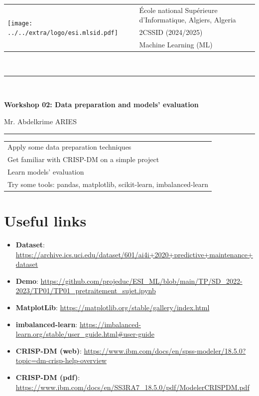 \documentclass[11pt, a4paper]{article}
\begin{document}
	
	\begin{tabular}{ll}
		\multirow{3}{*}{\texttt{[image: ../../extra/logo/esi.mlsid.pdf]}} & \'Ecole national Supérieure d'Informatique, Algiers, Algeria\\
		& 2CSSID (2024/2025)\\
		& Machine Learning (ML)
	\end{tabular}\\[.25cm]
	\noindent\rule{\textwidth}{1pt}\\[-0.5cm]
	\begin{center}
		{\LARGE \textbf{Workshop 02: Data preparation and models' evaluation}}
		\begin{flushright}
			Mr. Abdelkrime ARIES
		\end{flushright}
	\end{center}\vspace{-.25cm}
	\noindent\rule{\textwidth}{1pt}
	
	
	\begin{center}
		\begin{tabular}{|p{}|}
		\hline
		Apply some data preparation techniques \\
		Get familiar with CRISP-DM on a simple project\\
		Learn models' evaluation \\
		Try some tools: pandas, matplotlib, scikit-learn, imbalanced-learn \\
		\hline
	\end{tabular}
	\end{center}

\section*{Useful links}

\begin{itemize}
	\item \textbf{Dataset}: {\scriptsize \url{https://archive.ics.uci.edu/dataset/601/ai4i+2020+predictive+maintenance+dataset}} 
	\item \textbf{Demo}: {\scriptsize \url{https://github.com/projeduc/ESI_ML/blob/main/TP/SD_2022-2023/TP01/TP01_pretraitement_sujet.ipynb}}
	\item \textbf{MatplotLib}: {\scriptsize \url{https://matplotlib.org/stable/gallery/index.html}}
	\item \textbf{imbalanced-learn}: {\scriptsize \url{https://imbalanced-learn.org/stable/user_guide.html#user-guide}}
	\item \textbf{CRISP-DM (web)}: {\scriptsize \url{https://www.ibm.com/docs/en/spss-modeler/18.5.0?topic=dm-crisp-help-overview}}
	\item  \textbf{CRISP-DM (pdf)}: {\scriptsize \url{https://www.ibm.com/docs/en/SS3RA7_18.5.0/pdf/ModelerCRISPDM.pdf}}
\end{itemize}
\end{document}
